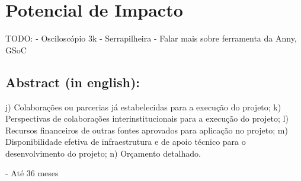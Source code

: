 \documentclass[titlepage,12pt]{article}
\begin{document}
\section{ Potencial de Impacto }

TODO:
- Osciloscópio 3k
- Serrapilheira
- Falar mais sobre ferramenta da Anny, GSoC

\subsection{ Abstract (in english): }


j) Colaborações ou parcerias já estabelecidas para a execução do projeto;
k) Perspectivas de colaborações interinstitucionais para a execução do projeto;
l) Recursos financeiros de outras fontes aprovados para aplicação no projeto;
m) Disponibilidade efetiva de infraestrutura e de apoio técnico para o desenvolvimento do
projeto;
n) Orçamento detalhado.

- Até 36 meses


 
\end{document}
